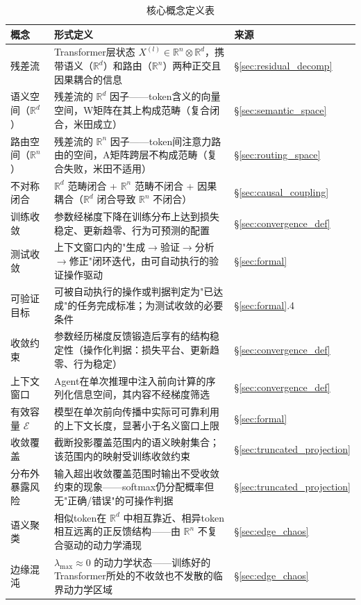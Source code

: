 \documentclass[11pt,a4paper]{article}
\theoremstyle{definition}
\newcommand{\effcap}{\mathcal{E}}
\begin{document}
\begin{table}[H]
\centering
\caption{核心概念定义表}
\begin{tabular}{@{}p{2.5cm}p{5.5cm}p{4cm}@{}}
\toprule
\textbf{概念} & \textbf{形式定义} & \textbf{来源} \\
\midrule
残差流 & Transformer层状态 $X^{(l)} \in \mathbb{R}^n \otimes \mathbb{R}^d$，携带语义（$\mathbb{R}^d$）和路由（$\mathbb{R}^n$）两种正交且因果耦合的信息 & \S\ref{sec:residual_decomp} \\
语义空间（$\mathbb{R}^d$） & 残差流的 $\mathbb{R}^d$ 因子——token含义的向量空间，W矩阵在其上构成范畴（复合闭合，米田成立） & \S\ref{sec:semantic_space} \\
路由空间（$\mathbb{R}^n$） & 残差流的 $\mathbb{R}^n$ 因子——token间注意力路由的空间，A矩阵跨层不构成范畴（复合失败，米田不适用） & \S\ref{sec:routing_space} \\
不对称闭合 & $\mathbb{R}^d$ 范畴闭合 + $\mathbb{R}^n$ 范畴不闭合 + 因果耦合（$\mathbb{R}^d$ 闭合导致 $\mathbb{R}^n$ 不闭合） & \S\ref{sec:causal_coupling} \\
训练收敛 & 参数经梯度下降在训练分布上达到损失稳定、更新趋零、行为可预测的配置 & \S\ref{sec:convergence_def} \\
测试收敛 & 上下文窗口内的"生成$\to$验证$\to$分析$\to$修正"闭环迭代，由可自动执行的验证操作驱动 & \S\ref{sec:formal} \\
可验证目标 & 可被自动执行的操作或判据判定为"已达成"的任务完成标准；为测试收敛的必要条件 & \S\ref{sec:formal}.4 \\
收敛约束 & 参数经历梯度反馈锻造后享有的结构稳定性（操作化判据：损失平台、更新趋零、行为稳定） & \S\ref{sec:convergence_def} \\
上下文窗口 & Agent在单次推理中注入前向计算的序列化信息空间，其内容不经梯度筛选 & \S\ref{sec:convergence_def} \\
有效容量 $\effcap$ & 模型在单次前向传播中实际可可靠利用的上下文长度，显著小于名义窗口上限 & \S\ref{sec:formal} \\
收敛覆盖 & 截断投影覆盖范围内的语义映射集合；该范围内的映射受训练收敛约束 & \S\ref{sec:truncated_projection} \\
分布外暴露风险 & 输入超出收敛覆盖范围时输出不受收敛约束的现象——softmax仍分配概率但无"正确/错误"的可操作判据 & \S\ref{sec:truncated_projection} \\
语义聚类 & 相似token在 $\mathbb{R}^d$ 中相互靠近、相异token相互远离的正反馈结构——由 $\mathbb{R}^n$ 不复合驱动的动力学涌现 & \S\ref{sec:edge_chaos} \\
边缘混沌 & $\lambda_{\max} \approx 0$ 的动力学状态——训练好的Transformer所处的不收敛也不发散的临界动力学区域 & \S\ref{sec:edge_chaos} \\

\end{tabular}
\end{table}
\end{document}
